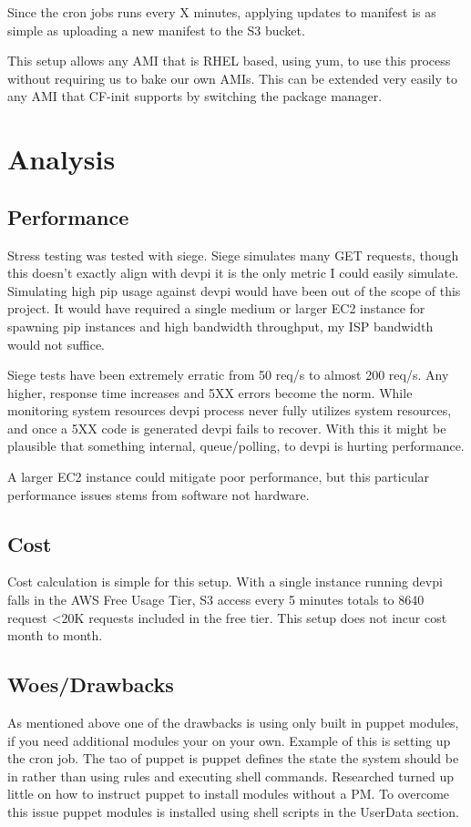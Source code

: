 \documentclass[12pt, letterpaper]{article}
\begin{document}
Since the cron jobs runs every X minutes, applying updates to manifest is as simple as uploading a new manifest to the S3 bucket.

This setup allows any AMI that is RHEL based, using yum, to use this process without requiring us to bake our own AMIs. This can
be extended very easily to any AMI that CF-init supports by switching the package manager.


\section{Analysis}
\subsection{Performance}
Stress testing was tested with siege. Siege simulates many GET requests, though this doesn't exactly align with devpi it is the only 
metric I could easily simulate. Simulating high pip usage against devpi would have been out of the scope of this project. It
would have required a single medium or larger EC2 instance for spawning pip instances and high bandwidth throughput, my ISP bandwidth
would not suffice.

Siege tests have been extremely erratic from 50 req/s to almost 200 req/s. Any higher, response time increases and 5XX errors become
the norm. While monitoring system resources devpi process never fully utilizes system resources, and once a 5XX code is generated 
devpi fails to recover. With this it might be plausible that something internal, queue/polling, to devpi is hurting performance.

A larger EC2 instance could mitigate poor performance, but this particular performance issues stems from software not hardware.

\subsection{Cost}
Cost calculation is simple for this setup. With a single instance running devpi falls in the AWS Free Usage Tier, S3 access every
5 minutes totals to 8640 request \textless 20K requests included in the free tier. This setup does not incur cost month to month.

\subsection{Woes/Drawbacks}
As mentioned above one of the drawbacks is using only built in puppet modules, if you need additional modules your on your own. 
Example of this is setting up the cron job. The tao of puppet is puppet defines the state the system should
be in rather than using rules and executing shell commands. Researched turned up little on how to instruct puppet to install modules
without a PM. To overcome this issue puppet modules is installed using shell scripts in the UserData section.
\end{document}
